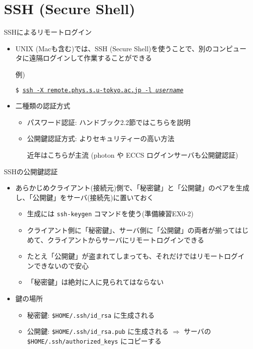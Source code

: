 \documentclass[dvipdfmx]{beamer}
\begin{document}
\section{SSH (Secure Shell)}

\begin{frame}[t,fragile]{SSHによるリモートログイン}
  \begin{itemize}
    \setlength{\itemsep}{1em}
  \item UNIX (Macも含む)では、SSH (Secure Shell)を使うことで、別のコンピュータに遠隔ログインして作業することができる

    例)
    
    {\tt \$ \underline{ssh -X remote.phys.s.u-tokyo.ac.jp -l {\it username}}}
  \item 二種類の認証方式
    \begin{itemize}
    \item パスワード認証: ハンドブック2.2節ではこちらを説明
    \item 公開鍵認証方式: よりセキュリティーの高い方法

      近年はこちらが主流 (photon や ECCS ログインサーバも公開鍵認証)
    \end{itemize}
  \end{itemize}
\end{frame}

\begin{frame}[t,fragile]{SSHの公開鍵認証}
  \begin{itemize}
    \setlength{\itemsep}{1em}
  \item あらかじめクライアント(接続元)側で、「秘密鍵」と「公開鍵」のペアを生成し、「公開鍵」をサーバ(接続先)に置いておく
    \begin{itemize}
    \item 生成には {\tt ssh-keygen} コマンドを使う(準備練習EX0-2)
    \item クライアント側に「秘密鍵」、サーバ側に「公開鍵」の両者が揃ってはじめて、クライアントからサーバにリモートログインできる
    \item たとえ「公開鍵」が盗まれてしまっても、それだけではリモートログインできないので安心
    \item 「秘密鍵」は絶対に人に見られてはならない
    \end{itemize}
  \item 鍵の場所
    \begin{itemize}
    \item 秘密鍵: {\tt \$HOME/.ssh/id\_rsa} に生成される
    \item 公開鍵: {\tt \$HOME/.ssh/id\_rsa.pub} に生成される $\Rightarrow$
      サーバの {\tt \$HOME/.ssh/authorized\_keys} にコピーする
    \end{itemize}
  \end{itemize}
\end{frame}
\end{document}
